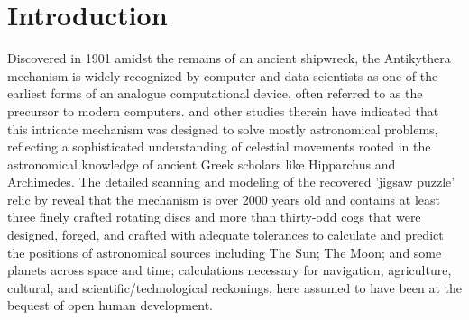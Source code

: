 \documentclass[final,5p,times,twocolumn,authoryear]{elsarticle}
\begin{document}


    

\section{Introduction}
\label{sec:intro}
%
Discovered in 1901 amidst the remains of an ancient shipwreck, the Antikythera mechanism is widely recognized by computer and data scientists as one of the earliest forms of an analogue computational device, often referred to as the precursor to modern computers. \cite{Freeth2021} and other studies therein have indicated that this intricate mechanism was designed to solve mostly astronomical problems, reflecting a sophisticated understanding of celestial movements rooted in the astronomical knowledge of ancient Greek scholars like Hipparchus and Archimedes. The detailed scanning and modeling of the recovered 'jigsaw puzzle' relic by \cite{Freeth2021} reveal that the mechanism is over 2000 years old and contains at least three finely crafted rotating discs and more than thirty-odd cogs that were designed, forged, and crafted with adequate tolerances to calculate and predict the positions of astronomical sources including The Sun; The Moon; and some planets across space and time; calculations necessary for navigation, agriculture, cultural, and scientific/technological reckonings, here assumed to have been at the bequest of open human development.
 
\end{document}
